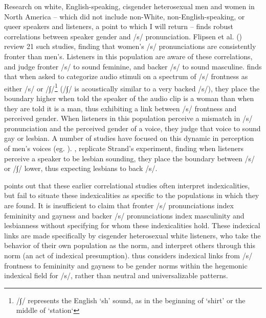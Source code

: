 \documentclass[12pt,twoside]{reedthesis}
\begin{document}
Research on white, English-speaking, cisgender heterosexual men and women in North America -- which did not include non-White, non-English-speaking, or queer speakers and listeners, a point to which I will return -- finds robust correlations between speaker gender and /s/ pronunciation. Flipsen et al. (\cite*{flipsen_acoustic_1999}) review 21 such studies, finding that women's /s/ pronunciations are consistently fronter than men's. Listeners in this population are aware of these correlations, and judge fronter /s/ to sound feminine, and backer /s/ to sound masculine. \textcite{strand_uncovering_1999} finds that when asked to categorize audio stimuli on a spectrum of /s/ frontness as either /s/ or /∫/\footnote{/∫/ represents the English `sh' sound, as in the beginning of `shirt' or the middle of `station`} (/∫/ is acoustically similar to a very backed /s/), they place the boundary higher when told the speaker of the audio clip is a woman than when they are told it is a man, thus exhibiting a link between /s/ frontness and perceived gender. When listeners in this population perceive a mismatch in /s/ pronunciation and the perceived gender of a voice, they judge that voice to sound gay or lesbian. A number of studies have focused on this dynamic in perception of men's voices (eg. \cite{levon_categories_2014, campbell-kibler_intersecting_2011}). \textcite{munson_influence_2006}, replicate Strand's experiment, finding when listeners perceive a speaker to be lesbian sounding, they place the boundary between /s/ or /∫/ lower, thus expecting lesbians to back /s/.

\textcite{calder_whose_2021} points out that these earlier correlational studies often interpret indexicalities, but fail to situate these indexicalities as specific to the populations in which they are found. It is insufficient to claim that fronter /s/ pronunciations index femininity and gayness and backer /s/ pronunciations index masculinity and lesbianness without specifying for whom these indexicalities hold. These indexical links are made specifically by cisgender heterosexual white listeners, who take the behavior of their own population as the norm, and interpret others through this norm (an act of indexical presumption). \textcite{calder_whose_2021} thus considers indexical links from /s/ frontness to femininity and gayness to be gender norms within the hegemonic indexical field for /s/, rather than neutral and universalizable patterns.

\end{document}
